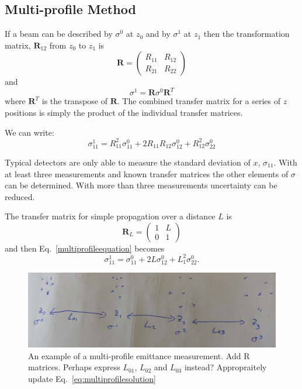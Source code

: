 \subsection{Multi-profile Method}

If a beam can be described by $\sigma^0$ at $z_0$ and by $\sigma^1$ at $z_1$ then the transformation matrix, $\mathbf{R}_{12}$ from $z_0$ to $z_1$ is
\begin{equation}
\mathbf{R} = \begin{pmatrix} R_{11} & R_{12} \\ R_{21} & R_{22} \end{pmatrix}
\end{equation}
and
\begin{equation}
\sigma^1 = \mathbf{R}\sigma^0\mathbf{R}^T
\end{equation}
where $\mathbf{R}^T$ is the transpose of $\mathbf{R}$.
The combined transfer matrix for a series of $z$ positions is simply the product of the individual transfer matrices.

We can write:
\begin{equation}\label{multiprofileequation}
\sigma_{11}^1 = R_{11}^2\sigma_{11}^0 + 2R_{11}R_{12}\sigma_{12}^0 + R_{12}^2\sigma_{22}^0
\end{equation}

Typical detectors are only able to measure the standard deviation of $x$, $\sigma_{11}$.
With at least three measurements and known transfer matrices the other elements of $\sigma$ can be determined.
With more than three measurements uncertainty can be reduced.

The transfer matrix for simple propagation over a distance $L$ is
\begin{equation}
\mathbf{R}_L = \begin{pmatrix}1 & L \\ 0 & 1\end{pmatrix}
\end{equation}
and then Eq.~\ref{multiprofileequation} becomes
\begin{equation}
\sigma_{11}^1 = \sigma_{11}^0 + 2L \sigma_{12}^0 + L_1^2\sigma_{22}^0.
\end{equation}

\begin{figure}
\includegraphics[width=\linewidth]{part2/Figs/multiprofileexample.jpg}
\caption{An example of a multi-profile emittance measurement. {\color{red}Add R matrices. Perhaps express $L_{01}$, $L_{02}$ and $L_{03}$ instead? Appropraitely update Eq.~\ref{eq:multiprofilesolution}}}
\label{figure:multiprofileexample}
\end{figure}

